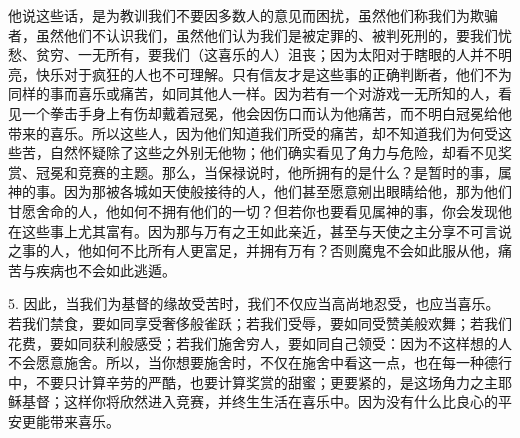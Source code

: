 他说这些话，是为教训我们不要因多数人的意见而困扰，虽然他们称我们为欺骗者，虽然他们不认识我们，虽然他们认为我们是被定罪的、被判死刑的，要我们忧愁、贫穷、一无所有，要我们（这喜乐的人）沮丧；因为太阳对于瞎眼的人并不明亮，快乐对于疯狂的人也不可理解。只有信友才是这些事的正确判断者，他们不为同样的事而喜乐或痛苦，如同其他人一样。因为若有一个对游戏一无所知的人，看见一个拳击手身上有伤却戴着冠冕，他会因伤口而认为他痛苦，而不明白冠冕给他带来的喜乐。所以这些人，因为他们知道我们所受的痛苦，却不知道我们为何受这些苦，自然怀疑除了这些之外别无他物；他们确实看见了角力与危险，却看不见奖赏、冠冕和竞赛的主题。那么，当保禄说时，他所拥有的是什么？是暂时的事，属神的事。因为那被各城如天使般接待的人，他们甚至愿意剜出眼睛给他，那为他们甘愿舍命的人，他如何不拥有他们的一切？但若你也要看见属神的事，你会发现他在这些事上尤其富有。因为那与万有之王如此亲近，甚至与天使之主分享不可言说之事的人，他如何不比所有人更富足，并拥有万有？否则魔鬼不会如此服从他，痛苦与疾病也不会如此逃遁。\par

5. 因此，当我们为基督的缘故受苦时，我们不仅应当高尚地忍受，也应当喜乐。若我们禁食，要如同享受奢侈般雀跃；若我们受辱，要如同受赞美般欢舞；若我们花费，要如同获利般感受；若我们施舍穷人，要如同自己领受：因为不这样想的人不会愿意施舍。所以，当你想要施舍时，不仅在施舍中看这一点，也在每一种德行中，不要只计算辛劳的严酷，也要计算奖赏的甜蜜；更要紧的，是这场角力之主耶稣基督；这样你将欣然进入竞赛，并终生生活在喜乐中。因为没有什么比良心的平安更能带来喜乐。\par

